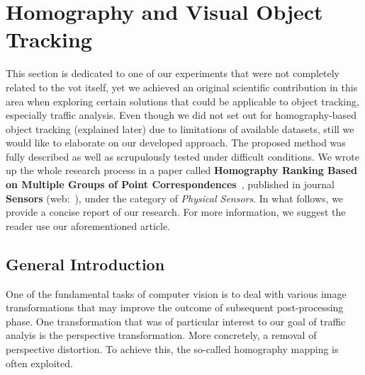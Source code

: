 \section{Homography and Visual Object Tracking}
\label{sec:HomographyAndVisualObjectTracking}

This section is dedicated to one of our experiments that were not completely related to the \gls{vot} itself, yet we achieved an original scientific contribution in this area when exploring certain solutions that could be applicable to object tracking, especially traffic analysis. Even though we did not set out for homography-based object tracking (explained later) due to limitations of available datasets, still we would like to elaborate on our developed approach. The proposed method was fully described as well as scrupulously tested under difficult conditions. We wrote up the whole research process in a paper called \textbf{Homography Ranking Based on Multiple Groups of Point Correspondences}~\cite{ondrasovic2021homography}, published in journal \textbf{Sensors} (web:~\cite{sensors}), under the category of \emph{Physical Sensors}. In what follows, we provide a concise report of our research. For more information, we suggest the reader use our aforementioned article.

\subsection{General Introduction}

One of the fundamental tasks of computer vision is to deal with various image transformations that may improve the outcome of subsequent post-processing phase. One transformation that was of particular interest to our goal of traffic analyis is the perspective transformation. More concretely, a removal of perspective distortion. To achieve this, the so-called homography mapping is often exploited.

